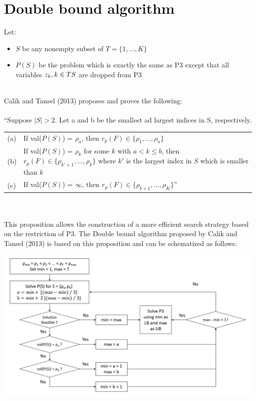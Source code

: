 \section{Double bound algorithm}

Let:
\begin{itemize}
	\item $S$ be any nonempty subset of $T = \lbrace 1, ..., K \rbrace$
	\item $P(S)$ be the problem which is exactly the same as P3 except that all variables $z_k, k \in T\\S$ are dropped from P3
\end{itemize}\ \\
Calik and Tansel (2013) proposes and proves the following:\\\\
``Suppose $|S| > 2$. Let a and b be the smallest ad largest indices in S, respectively.\\
\begin{tabularx}{\textwidth}{l X}
(a) & If val($P(S)$) = $\rho_a$, then $r_p(F) \in \lbrace \rho_1, ..., \rho_a \rbrace$\\
(b) & If val($P(S)$) = $\rho_k$ for some $k$ with $a < k \leq b$, then $r_p(F) \in \lbrace \rho_{k'+1}, ..., \rho_k \rbrace$ where $k'$ is the largest index in $S$ which is smaller than $k$ \\
(c) & If val($P(S)$) = $\infty$, then $r_p(F) \in \lbrace \rho_{b+1}, ..., \rho_K \rbrace$''\\
\end{tabularx}\ \\\\
This proposition allows the construction of a more efficient search strategy based on the restriction of P3. The Double bound algorithm proposed by Calik and Tansel (2013) is based on this proposition and can be schematized as follows:
\begin{center}
	\includegraphics[width=\textwidth]{../imgs/DB3.png}
\end{center}